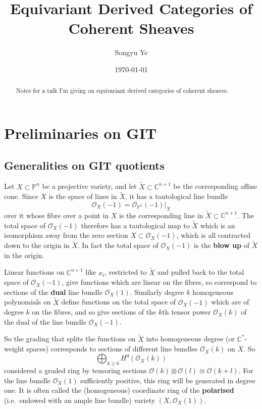 \documentclass[12pt]{article}
\begin{document}
\rhead{\today}
\cfoot{\thepage}

\title{Equivariant Derived Categories of Coherent Sheaves}

\author{Songyu Ye}
\date{\today}
\maketitle


\begin{abstract}
  Notes for a talk I'm giving on equivariant derived categories of coherent sheaves.
\end{abstract}

\tableofcontents

\section{Preliminaries on GIT}
\subsection{Generalities on GIT quotients}
Let $X \subset \mathbb{P}^n$ be a projective variety, and let $\widetilde{X} \subset \mathbb{C}^{n+1}$ be the corresponding affine cone.
Since $X$ is the space of lines in $\widetilde{X}$, it has a tautological line bundle
\[
  \mathcal{O}_X(-1) = \mathcal{O}_{\mathbb{P}^n}(-1)\big|_X
\]
over it whose fibre over a point in $X$ is the corresponding line in
$\widetilde{X} \subset \mathbb{C}^{n+1}$. The total space of $\mathcal{O}_X(-1)$ therefore
has a tautological map to $\widetilde{X}$ which is an isomorphism away from the zero section
$X \subset \mathcal{O}_X(-1)$, which is all contracted down to the origin in $\widetilde{X}$.
In fact the total space of $\mathcal{O}_X(-1)$ is the \textbf{blow up} of $\widetilde{X}$ in the origin.

Linear functions on $\mathbb{C}^{n+1}$ like $x_i$, restricted to $\widetilde{X}$ and pulled
back to the total space of $\mathcal{O}_X(-1)$, give functions which are linear on the fibres,
so correspond to sections of the \textbf{dual} line bundle $\mathcal{O}_X(1)$. Similarly degree $k$
homogeneous polynomials on $\widetilde{X}$ define functions on the total space of $\mathcal{O}_X(-1)$
which are of degree $k$ on the fibres, and so give sections of the $k$th tensor power
$\mathcal{O}_X(k)$ of the dual of the line bundle $\mathcal{O}_X(-1)$.

So the grading that splits the functions on $\widetilde{X}$ into homogeneous degree
(or $\mathbb{C}^*$-weight spaces) corresponds to sections of different line bundles $\mathcal{O}_X(k)$
on $X$. So
\[
  \bigoplus_{k \ge 0} H^0(\mathcal{O}_X(k))
\]
considered a graded ring by tensoring sections
$\mathcal{O}(k) \otimes \mathcal{O}(l) \cong \mathcal{O}(k+l)$. For the line bundle $\mathcal{O}_X(1)$
sufficiently positive, this ring will be generated in degree one. It is often called the
(homogeneous) coordinate ring of the \textbf{polarised} (i.e.~endowed with an ample line bundle)
variety $(X,\mathcal{O}_X(1))$.
\end{document}
